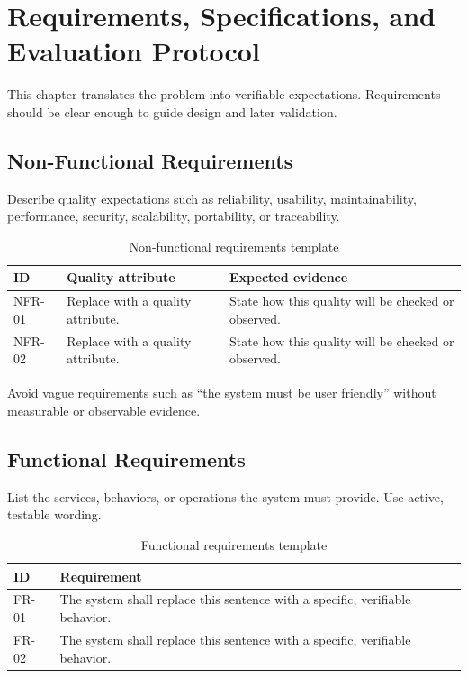 \chapter{Requirements, Specifications, and Evaluation Protocol}
\label{chap:requirements-specifications}

This chapter translates the problem into verifiable expectations. Requirements should be clear enough to guide design and later validation.

\section{Non-Functional Requirements}
Describe quality expectations such as reliability, usability, maintainability, performance, security, scalability, portability, or traceability.

\begin{table}[H]
    \centering
    \caption{Non-functional requirements template}
    \label{tab:non-functional-requirements-template}
    \small
    \begin{tabular}{L{0.14\textwidth}L{0.26\textwidth}L{0.50\textwidth}}
        \toprule
        \textbf{ID} & \textbf{Quality attribute} & \textbf{Expected evidence} \\
        \midrule
        NFR-01 & Replace with a quality attribute. & State how this quality will be checked or observed. \\
        \tabrowsep
        NFR-02 & Replace with a quality attribute. & State how this quality will be checked or observed. \\
        \bottomrule
    \end{tabular}
\end{table}

Avoid vague requirements such as ``the system must be user friendly'' without measurable or observable evidence.

\section{Functional Requirements}
List the services, behaviors, or operations the system must provide. Use active, testable wording.

\begin{table}[H]
    \centering
    \caption{Functional requirements template}
    \label{tab:functional-requirements-template}
    \small
    \begin{tabular}{L{0.14\textwidth}L{0.76\textwidth}}
        \toprule
        \textbf{ID} & \textbf{Requirement} \\
        \midrule
        FR-01 & The system shall replace this sentence with a specific, verifiable behavior. \\
        \tabrowsep
        FR-02 & The system shall replace this sentence with a specific, verifiable behavior. \\
        \bottomrule
    \end{tabular}
\end{table}

